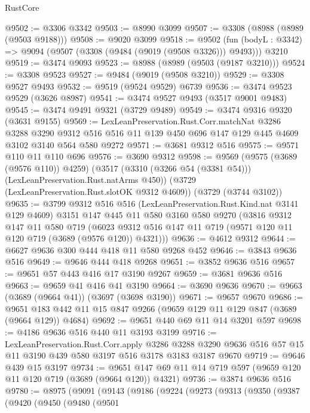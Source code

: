 \begin{lexlean}{RustCore}
\begin{coremodule}
@9502 := @3306 @3342
@9503 := @8990 @3099
@9507 := @3308 (@8988 (@8989 (@9503 @9188)))
@9508 := @9020 @3099
@9518 := @9502
    (fun (bodyL : @3342) => @9094 (@9507 (@3308 (@9484 (@9019 (@9508 @3326))) @9493)))
    @3210
@9519 := @3474 @9093
@9523 := @8988 (@8989 (@9503 (@9187 @3210)))
@9524 := @3308 @9523
@9527 := @9484 (@9019 (@9508 @3210))
@9529 := @3308 @9527 @9493
@9532 := @9519 (@9524 @9529) @6739
@9536 := @3474 @9523 @9529 (@3626 @8987)
@9541 := @3474 @9527 @9493 (@3517 @9001 @9483)
@9545 := @3474 @9491 @9321 (@3729 @9489)
@9549 := @3474 @9316 @9320 (@3631 @9155)
@9569 := LexLeanPreservation.Rust.Corr.matchNat
    @3286
    @3288
    @3290
    @9312
    @516
    @516
    @11
    @139
    @450
    @696
    @147
    @129
    @445
    @4609
    @3102
    @3140
    @564
    @580
    @9272
@9571 := @3681 @9312 @516
@9575 := @9571 @110 @11 @110 @696
@9576 := @3690 @9312
@9598 := @9569
    (@9575 (@3689 (@9576 @110)) @4259)
    (@3517 (@3310 (@3266 @54 (@3381 @54))) (LexLeanPreservation.Rust.natArms @450))
    (@3729 (LexLeanPreservation.Rust.slotOK @9312 @4609))
    (@3729 (@3744 @3102))
@9635 := @3799
    @9312
    @516
    @516
    (LexLeanPreservation.Rust.Kind.nat @3141 @129 @4609)
    @3151
    @147
    @445
    @11
    @580
    @3160
    @580
    @9270
    (@3816
      @9312
      @147
      @11
      @580
      @719
      (@6023 @9312 @516 @147 @11 @719 (@9571 @120 @11 @120 @719 (@3689 (@9576 @120)) @4321)))
@9636 := @4612 @9312
@9644 := @6627 @9636 @300 @444 @418 @11 @580 @9268 @452
@9646 := @3843 @9636 @516
@9649 := @9646 @444 @418 @9268
@9651 := @3852 @9636 @516
@9657 := @9651 @57 @443 @416 @17 @3190 @9267
@9659 := @3681 @9636 @516
@9663 := @9659 @41 @416 @41 @3190
@9664 := @3690 @9636
@9670 := @9663 (@3689 (@9664 @41)) (@3697 (@3698 @3190))
@9671 := @9657 @9670
@9686 := @9651 @183 @442 @11 @15 @847 @9266 (@9659 @129 @11 @129 @847 (@3689 (@9664 @129)) @4684)
@9692 := @9651 @440 @69 @11 @14 @3201 @597
@9698 := @4186 @9636 @516 @440 @11 @3193 @3199
@9716 := LexLeanPreservation.Rust.Corr.apply
    @3286
    @3288
    @3290
    @9636
    @516
    @57
    @15
    @11
    @3190
    @439
    @580
    @3197
    @516
    @3178
    @3183
    @3187
    @9670
@9719 := @9646 @439 @15 @3197
@9734 := @9651 @147 @69 @11 @14 @719 @597 (@9659 @120 @11 @120 @719 (@3689 (@9664 @120)) @4321)
@9736 := @3874 @9636 @516
@9780 := @8975
    (@9091
      (@9143
        (@9186
          (@9224
            (@9273
              (@9313
                (@9350
                  (@9387
                    (@9420
                      (@9450
                        (@9480
                          (@9501

\end{coremodule}
\end{lexlean}
